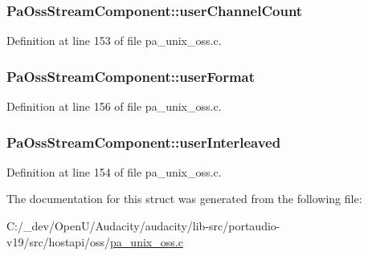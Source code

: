 \subsubsection[{\texorpdfstring{user\+Channel\+Count}{userChannelCount}}]{ Pa\+Oss\+Stream\+Component\+::user\+Channel\+Count}\hypertarget{struct_pa_oss_stream_component_a12a88cd8c43b4d70b78b8c3da9403943}{}\label{struct_pa_oss_stream_component_a12a88cd8c43b4d70b78b8c3da9403943}


Definition at line 153 of file pa\+\_\+unix\+\_\+oss.\+c.

\subsubsection[{\texorpdfstring{user\+Format}{userFormat}}]{ Pa\+Oss\+Stream\+Component\+::user\+Format}\hypertarget{struct_pa_oss_stream_component_a6a23ff2b04e56455303915b50d22bdf6}{}\label{struct_pa_oss_stream_component_a6a23ff2b04e56455303915b50d22bdf6}


Definition at line 156 of file pa\+\_\+unix\+\_\+oss.\+c.

\subsubsection[{\texorpdfstring{user\+Interleaved}{userInterleaved}}]{ Pa\+Oss\+Stream\+Component\+::user\+Interleaved}\hypertarget{struct_pa_oss_stream_component_ae7c7baf67ac9b4459a63a192ee4c156a}{}\label{struct_pa_oss_stream_component_ae7c7baf67ac9b4459a63a192ee4c156a}


Definition at line 154 of file pa\+\_\+unix\+\_\+oss.\+c.



The documentation for this struct was generated from the following file\+:\begin{DoxyCompactItemize}
\item 
C\+:/\+\_\+dev/\+Open\+U/\+Audacity/audacity/lib-\/src/portaudio-\/v19/src/hostapi/oss/\hyperlink{pa__unix__oss_8c}{pa\+\_\+unix\+\_\+oss.\+c}\end{DoxyCompactItemize}
